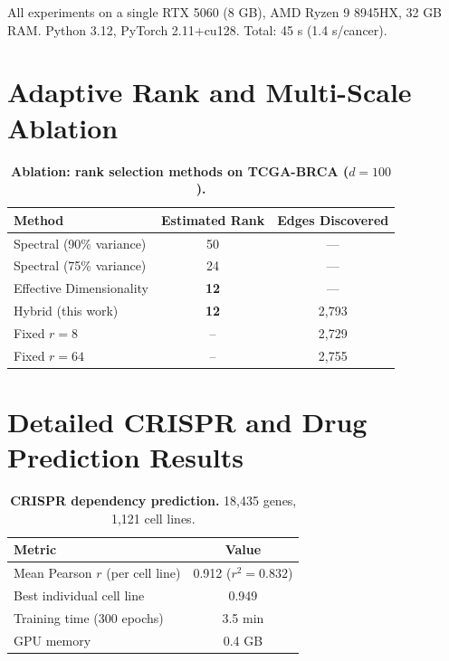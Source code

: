 \documentclass{article}
\theoremstyle{definition}
\begin{document}
All experiments on a single RTX 5060 (8 GB), AMD Ryzen 9 8945HX, 32 GB RAM. Python 3.12, PyTorch 2.11+cu128. Total: 45 s (1.4 s/cancer).

\section{Adaptive Rank and Multi-Scale Ablation}
\label{app:ablation}

\begin{table}[H]
\centering
\caption{\textbf{Ablation: rank selection methods on TCGA-BRCA ($d=100$).}}
\small
\begin{tabular}{lcc}
\toprule
Method & Estimated Rank & Edges Discovered \\
\midrule
Spectral (90\% variance) & 50 & --- \\
Spectral (75\% variance) & 24 & --- \\
Effective Dimensionality & \textbf{12} & --- \\
Hybrid (this work) & \textbf{12} & 2,793 \\
Fixed $r=8$ & -- & 2,729 \\
Fixed $r=64$ & -- & 2,755 \\
\bottomrule
\end{tabular}
\end{table}

\section{Detailed CRISPR and Drug Prediction Results}

\begin{table}[H]
\centering
\caption{\textbf{CRISPR dependency prediction.} 18,435 genes, 1,121 cell lines.}
\label{tab:crispr_detail}
\small
\begin{tabular}{lc}
\toprule
Metric & Value \\
\midrule
Mean Pearson $r$ (per cell line) & 0.912 ($r^2 = 0.832$) \\
Best individual cell line & 0.949 \\
Training time (300 epochs) & 3.5 min \\
GPU memory & 0.4 GB \\
\bottomrule
\end{tabular}
\end{table}
\end{document}

